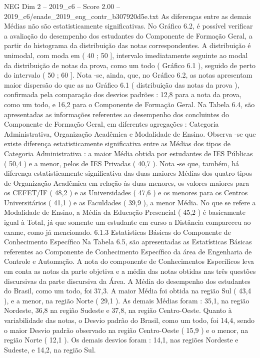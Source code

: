 \begin{textsample}{NEG Dim 2 – 2019\_c6 – Score 2.00 – 2019\_c6/enade\_2019\_eng\_contr\_b307920d5e.txt}
As diferenças entre as demais Médias não são estatisticamente significativas.
No Gráfico 6.2, é possível verificar a avaliação do desempenho dos estudantes do Componente de Formação Geral, a partir do histograma da distribuição das notas correspondentes.
A distribuição é unimodal, com moda em ( 40 ; 50 ], intervalo imediatamente seguinte ao modal da distribuição de notas da prova, como um todo ( Gráfico 6.1 ), seguido de perto do intervalo ( 50 ; 60 ].
Nota -se, ainda, que, no Gráfico 6.2, as notas apresentam maior dispersão do que as no Gráfico 6.1 ( distribuição das notas da prova ), confirmada pela comparação dos desvios padrões : 12,8 para a nota da prova, como um todo, e 16,2 para o Componente de Formação Geral.
Na Tabela 6.4, são apresentadas as informações referentes ao desempenho dos concluintes do Componente de Formação Geral, em diferentes agregações : Categoria Administrativa, Organização Acadêmica e Modalidade de Ensino.
Observa -se que existe diferença estatisticamente significativa entre as Médias dos tipos de Categoria Administrativa : a maior Média obtida por estudantes de IES Públicas ( 50,4 ) e a menor, pelos de IES Privadas ( 40,7 ).
Nota -se que, também, há diferença estatisticamente significativa das duas maiores Médias dos quatro tipos de Organização Acadêmica em relação às duas menores, os valores maiores para os CEFET/IF ( 48,2 ) e as Universidades ( 47,6 ) e os menores para os Centros Universitários ( 41,1 ) e as Faculdades ( 39,9 ), a menor Média.
No que se refere a Modalidade de Ensino, a Média da Educação Presencial ( 45,2 ) é basicamente igual à Total, já que somente um estudante em curso a Distância compareceu ao exame, como já mencionado. 6.1.3 Estatísticas Básicas do Componente de Conhecimento Específico Na Tabela 6.5, são apresentadas as Estatísticas Básicas referentes ao Componente de Conhecimento Específico da área de Engenharia de Controle e Automação.
A nota do componente de Conhecimentos Específicos leva em conta as notas da parte objetiva e a média das notas obtidas nas três questões discursivas da parte discursiva da Área.
A Média do desempenho dos estudantes do Brasil, como um todo, foi 37,3.
A maior Média foi obtida na região Sul ( 43,4 ), e a menor, na região Norte ( 29,1 ).
As demais Médias foram : 35,1, na região Nordeste, 36,8 na região Sudeste e 37,8, na região Centro-Oeste.
Quanto à variabilidade das notas, o Desvio padrão do Brasil, como um todo, foi 14,4, sendo o maior Desvio padrão observado na região Centro-Oeste ( 15,9 ) e o menor, na região Norte ( 12,1 ).
Os demais desvios foram : 14,1, nas regiões Nordeste e Sudeste, e 14,2, na região Sul.

\end{textsample}
